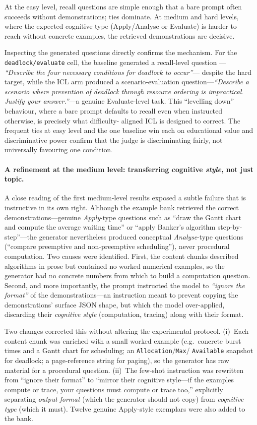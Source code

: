 \documentclass[12pt,a4paper]{report}
\begin{document}
At the easy level, recall questions are simple enough that a bare prompt often
succeeds without demonstrations; ties dominate. At medium and hard levels, where
the expected cognitive type (Apply/Analyse or Evaluate) is harder to reach
without concrete examples, the retrieved demonstrations are decisive.

Inspecting the generated questions directly confirms the mechanism. For the
\texttt{deadlock/evaluate} cell, the baseline generated a recall-level question
--- \emph{``Describe the four necessary conditions for deadlock to occur''}---
despite the hard target, while the ICL arm produced a scenario-evaluation
question---\emph{``Describe a scenario where prevention of deadlock through
resource ordering is impractical. Justify your answer.''}---a genuine
Evaluate-level task. This ``levelling down'' behaviour, where a bare prompt
defaults to recall even when instructed otherwise, is precisely what difficulty-
aligned ICL is designed to correct. The frequent ties at easy level and the one
baseline win each on educational value and discriminative power confirm that the
judge is discriminating fairly, not universally favouring one condition.

\paragraph{A refinement at the medium level: transferring cognitive \emph{style}, not just topic.}
A close reading of the first medium-level results exposed a subtle failure that
is instructive in its own right. Although the example bank retrieved the correct
demonstrations---genuine \emph{Apply}-type questions such as ``draw the Gantt
chart and compute the average waiting time'' or ``apply Banker's algorithm
step-by-step''---the generator nevertheless produced conceptual
\emph{Analyse}-type questions (``compare preemptive and non-preemptive
scheduling''), never procedural computation. Two causes were identified. First,
the content chunks described algorithms in prose but contained no worked
numerical examples, so the generator had no concrete numbers from which to build
a computation question. Second, and more importantly, the prompt instructed the
model to \emph{``ignore the format''} of the demonstrations---an instruction
meant to prevent copying the demonstrations' surface JSON shape, but which the
model over-applied, discarding their \emph{cognitive style} (computation,
tracing) along with their format.

Two changes corrected this without altering the experimental protocol. (i)~Each
content chunk was enriched with a small worked example (e.g.\ concrete burst
times and a Gantt chart for scheduling; an \texttt{Allocation}/\texttt{Max}/%
\texttt{Available} snapshot for deadlock; a page-reference string for paging), so
the generator has raw material for a procedural question. (ii)~The few-shot
instruction was rewritten from ``ignore their format'' to ``mirror their
cognitive style---if the examples compute or trace, your questions must compute
or trace too,'' explicitly separating \emph{output format} (which the generator
should not copy) from \emph{cognitive type} (which it must). Twelve genuine
Apply-style exemplars were also added to the bank.
\end{document}
